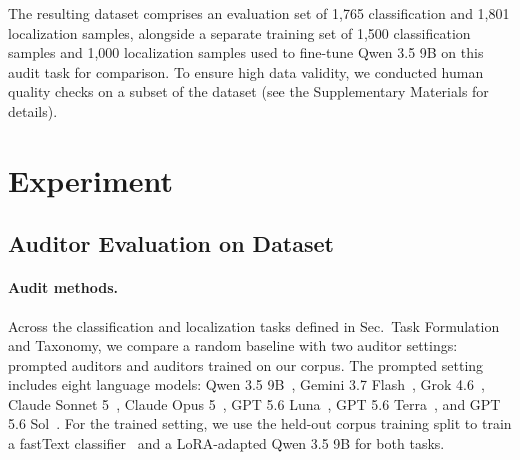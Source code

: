 \documentclass[letterpaper]{article} %
\begin{document}

The resulting dataset comprises an evaluation set of 1,765 classification and 1,801 localization samples, alongside a separate training set of 1,500 classification samples and 1,000 localization samples used to fine-tune Qwen 3.5 9B on this audit task for comparison. To ensure high data validity, we conducted human quality checks on a subset of the dataset (see the Supplementary Materials for details).


\section{Experiment}

\subsection{Auditor Evaluation on Dataset}

\paragraph{Audit methods.} Across the classification and localization tasks defined in Sec.~Task Formulation and Taxonomy, we compare a random baseline with two auditor settings: prompted auditors and auditors trained on our corpus. The prompted setting includes eight language models: Qwen 3.5 9B~\cite{qwen3.5}, Gemini 3.7 Flash~\cite{gemini3.7flash}, Grok 4.6~\cite{grok4.6}, Claude Sonnet 5~\cite{claudesonnet5}, Claude Opus 5~\cite{claudeopus5}, GPT 5.6 Luna~\cite{gpt5.6luna}, GPT 5.6 Terra~\cite{gpt5.6terra}, and GPT 5.6 Sol~\cite{gpt5.6sol}. For the trained setting, we use the held-out corpus training split to train a fastText classifier~\citep{joulin2017bag} and a LoRA-adapted Qwen 3.5 9B for both tasks.
\end{document}
